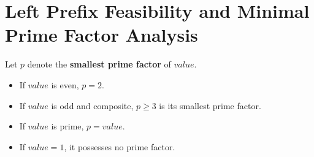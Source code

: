\documentclass[10pt,journal,compsoc,onecolumn]{IEEEtran}
\begin{document}
\section{Left Prefix Feasibility and Minimal Prime Factor Analysis}
\label{sec:left_prefix}

Let $p$ denote the \textbf{smallest prime factor} of $value$.
\begin{itemize}
    \item If $value$ is even, $p = 2$.
    \item If $value$ is odd and composite, $p \ge 3$ is its smallest prime factor.
    \item If $value$ is prime, $p = value$.
    \item If $value = 1$, it possesses no prime factor.
\end{itemize}
\end{document}
